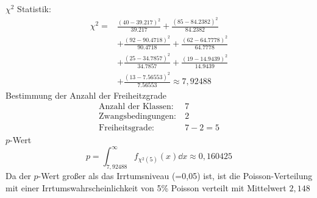 \documentclass[prb,12pt]{revtex4-2}
\theoremstyle{definition}
\theoremstyle{definition}
\begin{document}
$\chi^2$ Statistik:
\begin{align*}
	\chi^2 =& \frac{(40 - 39.217)^2}{39.217}+\frac{(85 - 84.2382)^2}{84.2382}\\
	&+\frac{(92 - 90.4718)^2}{90.4718}+\frac{(62 - 64.7778)^2}{64.7778}\\
	&+\frac{(25 - 34.7857)^2}{34.7857}+\frac{(19 - 14.9439)^2}{14.9439}\\
	&+\frac{(13 - 7.56553)^2}{7.56553}\approx 7,92488
\end{align*}
Bestimmung der Anzahl der Freiheitzgrade
\begin{align*}
\text{Anzahl der Klassen}:&~7\\
\text{Zwangsbedingungen}:&~2\\
\text{Freiheitsgrade}:&~7-2=5
\end{align*}
$p$-Wert
\[p=\int_{7,92488}^\infty f_{\chi^2(5)}(x) \dd{x}\approx 0,160425\]
Da der $p$-Wert großer als das Irrtumsniveau (=0,05) ist, ist die Poisson-Verteilung mit einer Irrtumswahrscheinlichkeit von 5\% Poisson verteilt mit Mittelwert $2,148$
\end{document}
